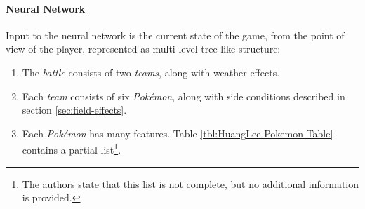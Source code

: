 \paragraph{Neural Network}
Input to the neural network is the current state of the game, from the point of view of the player,
represented as multi-level tree-like structure:
\begin{enumerate}
    \item The \textit{battle} consists of two \textit{teams}, along with weather effects.
    \item Each \textit{team} consists of six \textit{Pokémon}, along with side conditions 
    described in section \ref{sec:field-effects}.
    \item Each \textit{Pokémon} has many features. Table \ref{tbl:HuangLee-Pokemon-Table} contains a partial 
    list\footnote{The authors state that this list is not complete, but no additional information is provided.}.
\end{enumerate}
